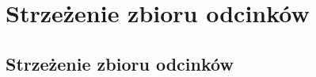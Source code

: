 \documentclass[brudnopis]{xmgr}
\DeclarePairedDelimiter\ceil{\lceil}{\rceil}
\DeclarePairedDelimiter\floor{\lfloor}{\rfloor}
\begin{document}




\chapter{Strzeżenie zbioru odcinków}
\section{Strzeżenie zbioru odcinków}
\end{document}

